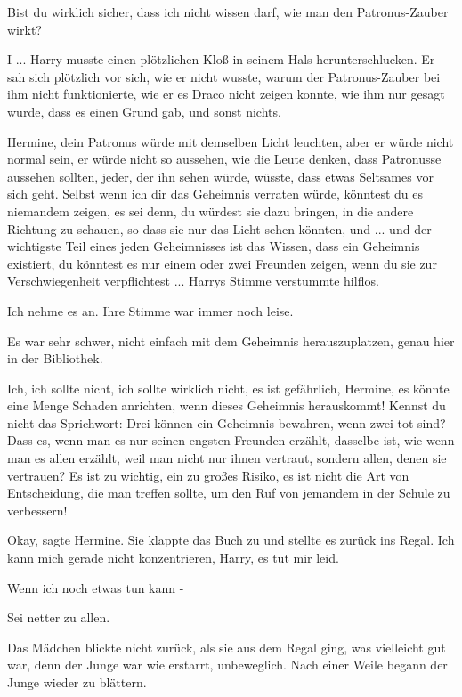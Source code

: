 \glqq{}Bist du wirklich sicher, dass ich nicht wissen darf, wie man den
Patronus-Zauber wirkt?\grqq{}

\glqq{}I ...\grqq{} Harry musste einen plötzlichen Kloß in seinem Hals
herunterschlucken. Er sah sich plötzlich vor sich, wie er nicht wusste, warum
der Patronus-Zauber bei ihm nicht funktionierte, wie er es Draco nicht zeigen
konnte, wie ihm nur gesagt wurde, dass es einen Grund gab, und sonst nichts.

\glqq{}Hermine, dein Patronus würde mit demselben Licht leuchten, aber er würde
nicht normal sein, er würde nicht so aussehen, wie die Leute denken, dass
Patronusse aussehen sollten, jeder, der ihn sehen würde, wüsste, dass etwas
Seltsames vor sich geht. Selbst wenn ich dir das Geheimnis verraten würde,
könntest du es niemandem zeigen, es sei denn, du würdest sie dazu bringen, in
die andere Richtung zu schauen, so dass sie nur das Licht sehen könnten, und ...
und der wichtigste Teil eines jeden Geheimnisses ist das Wissen, dass ein
Geheimnis existiert, du könntest es nur einem oder zwei Freunden zeigen, wenn du
sie zur Verschwiegenheit verpflichtest ...\grqq{} Harrys Stimme verstummte
hilflos.

\glqq{}Ich nehme es an.\grqq{} Ihre Stimme war immer noch leise.

Es war sehr schwer, nicht einfach mit dem Geheimnis herauszuplatzen, genau hier
in der Bibliothek.

\glqq{}Ich, ich sollte nicht, ich sollte wirklich nicht, es ist gefährlich,
Hermine, es könnte eine Menge Schaden anrichten, wenn dieses Geheimnis
herauskommt! Kennst du nicht das Sprichwort: Drei können ein Geheimnis bewahren,
wenn zwei tot sind? Dass es, wenn man es nur seinen engsten Freunden erzählt,
dasselbe ist, wie wenn man es allen erzählt, weil man nicht nur ihnen vertraut,
sondern allen, denen sie vertrauen? Es ist zu wichtig, ein zu großes Risiko, es
ist nicht die Art von Entscheidung, die man treffen sollte, um den Ruf von
jemandem in der Schule zu verbessern!\grqq{}

\glqq{}Okay\grqq{}, sagte Hermine. Sie klappte das Buch zu und stellte es zurück
ins Regal. \glqq{}Ich kann mich gerade nicht konzentrieren, Harry, es tut mir
leid.\grqq{}

\glqq{}Wenn ich noch etwas tun kann -\grqq{}

\glqq{}Sei netter zu allen.\grqq{}

Das Mädchen blickte nicht zurück, als sie aus dem Regal ging, was vielleicht gut
war, denn der Junge war wie erstarrt, unbeweglich. Nach einer Weile begann der
Junge wieder zu blättern.

